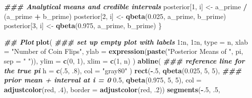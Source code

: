 \documentclass[
  11pt,
]{article}
\newenvironment{Shaded}{\begin{snugshade}}{\end{snugshade}}
\newcommand{\AttributeTok}[1]{\textcolor[rgb]{0.13,0.29,0.53}{#1}}
\newcommand{\DecValTok}[1]{\textcolor[rgb]{0.00,0.00,0.81}{#1}}
\newcommand{\DocumentationTok}[1]{\textcolor[rgb]{0.56,0.35,0.01}{\textbf{\textit{#1}}}}
\newcommand{\FloatTok}[1]{\textcolor[rgb]{0.00,0.00,0.81}{#1}}
\newcommand{\FunctionTok}[1]{\textcolor[rgb]{0.13,0.29,0.53}{\textbf{#1}}}
\newcommand{\NormalTok}[1]{#1}
\newcommand{\OtherTok}[1]{\textcolor[rgb]{0.56,0.35,0.01}{#1}}
\newcommand{\SpecialCharTok}[1]{\textcolor[rgb]{0.81,0.36,0.00}{\textbf{#1}}}
\newcommand{\StringTok}[1]{\textcolor[rgb]{0.31,0.60,0.02}{#1}}
\begin{document}
\begin{Shaded}
\begin{Highlighting}[]
  \DocumentationTok{\#\#\# Analytical means and credible intervals}
\NormalTok{  posterior[}\DecValTok{1}\NormalTok{, i] }\OtherTok{\textless{}{-}}\NormalTok{ a\_prime }\SpecialCharTok{/}\NormalTok{ (a\_prime }\SpecialCharTok{+}\NormalTok{ b\_prime)}
\NormalTok{  posterior[}\DecValTok{2}\NormalTok{, i] }\OtherTok{\textless{}{-}} \FunctionTok{qbeta}\NormalTok{(}\FloatTok{0.025}\NormalTok{, a\_prime, b\_prime)}
\NormalTok{  posterior[}\DecValTok{3}\NormalTok{, i] }\OtherTok{\textless{}{-}} \FunctionTok{qbeta}\NormalTok{(}\FloatTok{0.975}\NormalTok{, a\_prime, b\_prime)}
\NormalTok{\}}

\DocumentationTok{\#\# Plot}
\FunctionTok{plot}\NormalTok{(                                }\DocumentationTok{\#\#\# set up empty plot with labels}
  \DecValTok{1}\SpecialCharTok{:}\NormalTok{n, }\DecValTok{1}\SpecialCharTok{:}\NormalTok{n,}
  \AttributeTok{type =} \StringTok{\textquotesingle{}n\textquotesingle{}}\NormalTok{,}
  \AttributeTok{xlab =} \StringTok{"Number of Coin Flips"}\NormalTok{,}
  \AttributeTok{ylab =} \FunctionTok{expression}\NormalTok{(}\FunctionTok{paste}\NormalTok{(}\StringTok{"Posterior Means of "}\NormalTok{,}
\NormalTok{                          pi,}
                          \AttributeTok{sep =} \StringTok{" "}\NormalTok{)), }
  \AttributeTok{ylim =} \FunctionTok{c}\NormalTok{(}\DecValTok{0}\NormalTok{, }\DecValTok{1}\NormalTok{),}
  \AttributeTok{xlim =} \FunctionTok{c}\NormalTok{(}\DecValTok{1}\NormalTok{, n)}
\NormalTok{)}
\FunctionTok{abline}\NormalTok{(                              }\DocumentationTok{\#\#\# reference line for the true pi}
  \AttributeTok{h =} \FunctionTok{c}\NormalTok{(.}\DecValTok{5}\NormalTok{, .}\DecValTok{8}\NormalTok{),}
  \AttributeTok{col =} \StringTok{"gray80"}
\NormalTok{)}
\FunctionTok{rect}\NormalTok{(}\SpecialCharTok{{-}}\NormalTok{.}\DecValTok{5}\NormalTok{, }\FunctionTok{qbeta}\NormalTok{(}\FloatTok{0.025}\NormalTok{, }\DecValTok{5}\NormalTok{, }\DecValTok{5}\NormalTok{),        }\DocumentationTok{\#\#\# prior mean + interval at i = 0}
     \FloatTok{0.5}\NormalTok{, }\FunctionTok{qbeta}\NormalTok{(}\FloatTok{0.975}\NormalTok{, }\DecValTok{5}\NormalTok{, }\DecValTok{5}\NormalTok{),}
     \AttributeTok{col =} \FunctionTok{adjustcolor}\NormalTok{(}\StringTok{\textquotesingle{}red\textquotesingle{}}\NormalTok{, .}\DecValTok{4}\NormalTok{),}
     \AttributeTok{border =} \FunctionTok{adjustcolor}\NormalTok{(}\StringTok{\textquotesingle{}red\textquotesingle{}}\NormalTok{, .}\DecValTok{2}\NormalTok{))}
\FunctionTok{segments}\NormalTok{(}\SpecialCharTok{{-}}\NormalTok{.}\DecValTok{5}\NormalTok{, .}\DecValTok{5}\NormalTok{,}

\end{Highlighting}
\end{Shaded}
\end{document}
